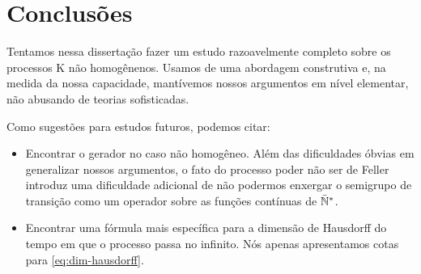 \chapter{Conclusões}
\label{cap:conclusao}

Tentamos nessa dissertação fazer um estudo razoavelmente completo
sobre os processos K não homogênenos. Usamos de uma abordagem
construtiva e, na medida da nossa capacidade, mantívemos nossos
argumentos em nível elementar, não abusando de teorias sofisticadas.

Como sugestões para estudos futuros, podemos citar:

\begin{itemize}
\item Encontrar o gerador no caso não homogêneo. Além das dificuldades
  óbvias em generalizar nossos argumentos, o fato do processo
  poder não ser de Feller introduz uma dificuldade adicional  de não
  podermos enxergar o semigrupo de transição como um operador sobre as
  funções contínuas de ${\mathbb{\bar{N}^*}}$.

\item Encontrar uma fórmula mais específica para a dimensão de
  Hausdorff do tempo em que o processo passa no infinito. Nós
  apenas apresentamos cotas para \eqref{eq:dim-hausdorff}.
\end{itemize}



